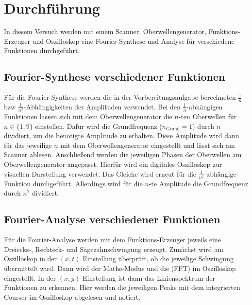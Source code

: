 \section{Durchführung}
\label{sec:Durchführung}
In diesem Versuch werden mit einem Scanner, Oberwellengenerator, Funktions-Erzeuger und Oszilloskop eine 
Fourier-Synthese und Analyse für verschiedene Funktionen durchgeführt.
\subsection{Fourier-Synthese verschiedener Funktionen}
Für die Fourier-Synthese werden die in der Vorbereitungsaufgabe berechneten 
$\frac{1}{n}$- bzw $\frac{1}{n^2}$-Abhängigkeiten der Amplituden verwendet. 
Bei den $\frac{1}{n}$-abhängigen Funktionen lassen sich mit dem Oberwellengenerator
die $n$-ten Oberwellen für $n \in \{1,9\}$ einstellen. Dafür wird die Grundfrequenz 
($n_{\text{Grund}}=1$) durch $n$ dividiert, um die benötigte Amplitude zu erhalten. Diese Amplitude 
wird dann für das jeweilige $n$ mit dem Oberwellengenerator eingestellt und lässt sich am
Scanner ablesen.
Anschließend werden die jeweiligen Phasen der Oberwellen am Oberwellengenerator angepasst. 
Hierfür wird ein digitales Oszilloskop zur visuellen Darstellung verwendet. 
Das Gleiche wird erneut für die $\frac{1}{n^2}$-abhängige Funktion durchgeführt. Allerdings
wird für die $n$-te Amplitude die Grundfrequenz durch $n^2$ dividiert. 
\subsection{Fourier-Analyse verschiedener Funktionen}
Für die Fourier-Analyse werden mit dem Funktions-Erzeuger jeweils eine Dreiecks-, Rechteck- und 
Sägezahnschwingung erzeugt. Zunächst wird am Oszilloskop in der $(x,t)$ Einstellung überprüft,
ob die jeweilige Schwingung übermittelt wird. Dann wird der Mathe-Modus und die \grqq{}(FFT)
im Oszilloskop eingestellt. In der $(x,y)$ Einstellung ist dann das Linienspektrum der Funktionen zu erkennen. Hier werden die jeweiligen Peaks mit
dem integrierten Courser im Oszilloskop abgelesen und notiert.